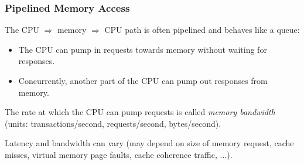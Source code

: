 \begin{frame}
\frametitle{Pipelined Memory Access}

\begin{center}
\end{center}

\vspace*{1ex}

The CPU $\Rightarrow$ memory $\Rightarrow$ CPU path is often pipelined
and behaves like a queue:

{\footnotesize
\begin{itemize}

 \item The CPU can pump in requests towards memory without waiting for responses.

 \item Concurrently, another part of the CPU can pump out responses from memory.
\end{itemize}}

\pause

The rate at which the CPU can pump requests is called \emph{memory
bandwidth} (units: transactions/second, requests/second, bytes/second).

\vspace*{1ex}

\pause

Latency and bandwidth can vary (may depend on size of memory request,
cache misses, virtual memory page faults, cache coherence traffic,
...).

\end{frame}






